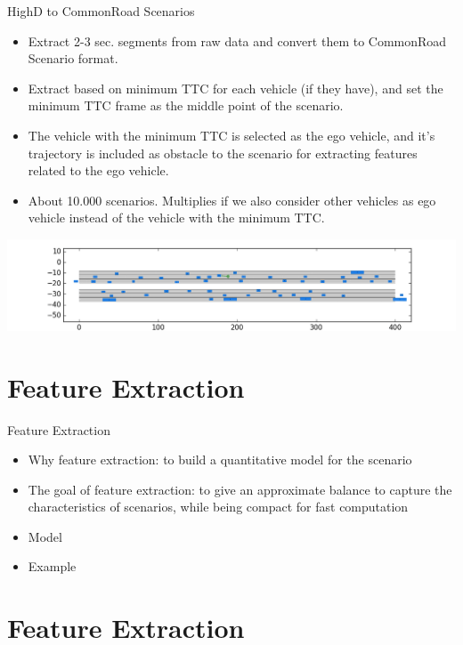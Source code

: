 \documentclass[shortpres]{beamer}
\begin{document}
\begin{frame}{HighD to CommonRoad Scenarios}	

\begin{itemize} 
\item Extract 2-3 sec. segments from raw data and convert them to CommonRoad Scenario format.
\vfill \item Extract based on minimum TTC for each vehicle (if they have), and set the minimum TTC frame as the middle point of the scenario.
\vfill \item The vehicle with the minimum TTC is selected as the ego vehicle, and it's trajectory is included as obstacle to the scenario for extracting features related to the ego vehicle.
\vfill \item About 10.000 scenarios. Multiplies if we also consider other vehicles as ego vehicle instead of the vehicle with the minimum TTC.
\end{itemize}

\vfill \includegraphics[width=\textwidth]{cr-example-15}

\end{frame}

\section{Feature Extraction}	

\begin{frame}{Feature Extraction}	

\begin{itemize} 
\item Why feature extraction: to build a quantitative model for the scenario
\vfill \item The goal of feature extraction: to give an approximate balance to capture the characteristics of scenarios, while being compact for fast computation
\vfill \item Model
\vfill \item Example
\end{itemize}
\end{frame}

\section{Feature Extraction}
\end{document}
